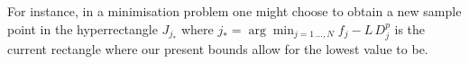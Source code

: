 For instance, in a minimisation problem one might choose to obtain a new sample point in the hyperrectangle $J_{j_*}$ where  $ j_* = \arg\min_{j=1\,...,N} f_j - L \, D_j^p $ is the current rectangle where our present bounds allow for the lowest value to be.



%
%

